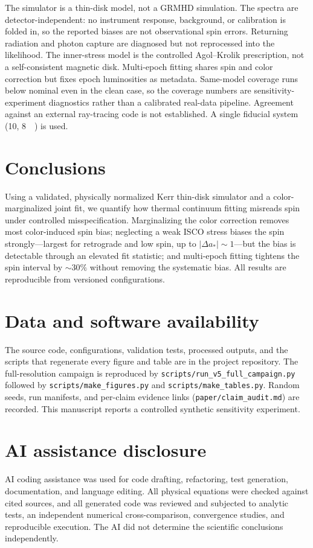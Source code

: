 \documentclass[aip,reprint,amsmath,amssymb]{revtex4-2}
\begin{document}
The simulator is a thin-disk model, not a GRMHD simulation. The spectra are
detector-independent: no instrument response, background, or calibration is
folded in, so the reported biases are not observational spin errors. Returning
radiation and photon capture are diagnosed but not reprocessed into the
likelihood. The inner-stress model is the controlled Agol--Krolik prescription,
not a self-consistent magnetic disk. Multi-epoch fitting shares spin and color
correction but fixes epoch luminosities as metadata. Same-model coverage runs
below nominal even in the clean case, so the coverage numbers are
sensitivity-experiment diagnostics rather than a calibrated real-data pipeline.
Agreement against an external ray-tracing code is not established. A single
fiducial system (\SI{10}{\Msun}, \SI{8}{\kilo\parsec}) is used.

\section{Conclusions}

Using a validated, physically normalized Kerr thin-disk simulator and a
color-marginalized joint fit, we quantify how thermal continuum fitting misreads
spin under controlled misspecification. Marginalizing the color correction
removes most color-induced spin bias; neglecting a weak ISCO stress biases the
spin strongly---largest for retrograde and low spin, up to $|\Delta a_\ast|\sim
1$---but the bias is detectable through an elevated fit statistic; and
multi-epoch fitting tightens the spin interval by $\sim 30\%$ without removing the
systematic bias. All results are reproducible from versioned configurations.

\section*{Data and software availability}

The source code, configurations, validation tests, processed outputs, and the
scripts that regenerate every figure and table are in the project repository. The
full-resolution campaign is reproduced by
\texttt{scripts/run\_v5\_full\_campaign.py} followed by
\texttt{scripts/make\_figures.py} and \texttt{scripts/make\_tables.py}. Random
seeds, run manifests, and per-claim evidence links (\texttt{paper/claim\_audit.md})
are recorded. This manuscript reports a controlled synthetic sensitivity
experiment.

\section*{AI assistance disclosure}

AI coding assistance was used for code drafting, refactoring, test generation,
documentation, and language editing. All physical equations were checked against
cited sources, and all generated code was reviewed and subjected to analytic
tests, an independent numerical cross-comparison, convergence studies, and
reproducible execution. The AI did not determine the scientific conclusions
independently.


\end{document}
